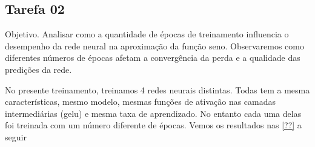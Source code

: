 \subsection{Tarefa 02}

\begin{comandoquestao}
    Objetivo. Analisar como a quantidade de épocas de treinamento influencia o desempenho da rede neural na aproximação da função seno. Observaremos como diferentes números de épocas afetam a convergência da perda e a qualidade das predições da rede.
\end{comandoquestao}

No presente treinamento, treinamos 4 redes neurais distintas. Todas tem a mesma características, mesmo modelo, mesmas funções de ativação nas camadas intermediárias (gelu) e mesma taxa de aprendizado. No entanto cada uma delas foi treinada com um número diferente de épocas. Vemos os resultados nas \cref{??} a seguir



